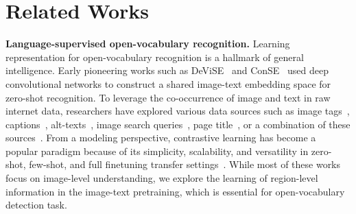 \documentclass[10pt,twocolumn,letterpaper]{article}
\renewcommand{\paragraph}[1]{\vspace{1mm}\noindent\textbf{#1}}
\begin{document}
\section{Related Works}
\label{sec:related}
\paragraph{Language-supervised open-vocabulary recognition.}\quad
Learning representation for open-vocabulary recognition is a hallmark of general intelligence. Early pioneering works such as DeViSE~\cite{frome2013devise} and ConSE~\cite{norouzi2013zero} used deep convolutional networks to construct a shared image-text embedding space for zero-shot recognition. To leverage the co-occurrence of image and text in raw internet data, researchers have explored various data sources such as image tags~\cite{chen2015webly,divvala2014learning,joulin2016learning}, captions~\cite{desai2021virtex,he2017fine,sariyildiz2020learning,wang2009learning}, alt-texts~\cite{align, schuhmann2021laion}, image search queries~\cite{radford2021clip}, page title~\cite{chen2022pali}, or a combination of these sources~\cite{chen2022pali}. From a modeling perspective, contrastive learning has become a popular paradigm because of its simplicity, scalability, and versatility in zero-shot, few-shot, and full finetuning transfer settings~\cite{basic, radford2021clip, li2022scaling,dong2022clip,pmlr-v162-li22n}. While most of these works focus on image-level understanding, we explore the learning of region-level information in the image-text pretraining, which is essential for open-vocabulary detection task.
\end{document}

